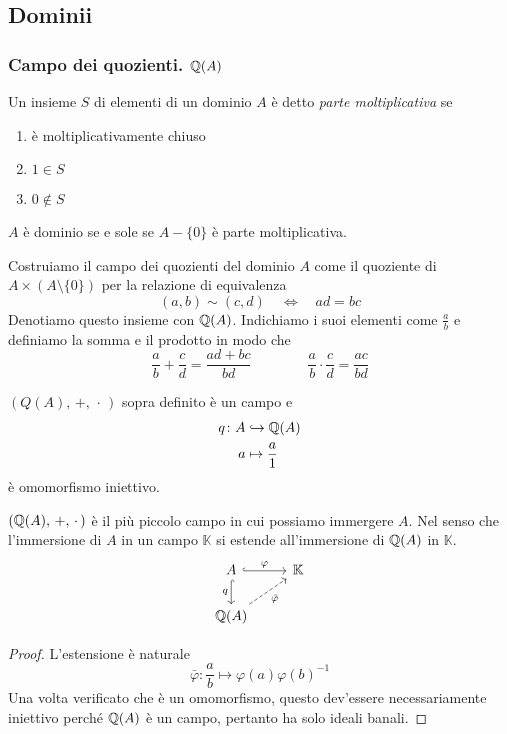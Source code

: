 \subsection{Dominii}
\begin{multicols}{2}

\subsubsection{Campo dei quozienti. $ \mathbb{Q}(A) $}

\begin{definition}
	Un insieme $ S $ di elementi di un dominio $ A $ è detto \emph{parte moltiplicativa} se
	\begin{enumerate}
		\item è moltiplicativamente chiuso
		\item $ 1 \in S $
		\item $ 0 \notin S $
	\end{enumerate}
\end{definition}

\begin{remark}
	$ A $ è dominio se e sole se $ A - \{0\} $ è parte moltiplicativa.
\end{remark}

Costruiamo il campo dei quozienti del dominio $ A $ come il quoziente di $ A \times (A \setminus \{0\}) $ per la relazione di equivalenza $$  (a, b) \sim (c, d) \quad\Leftrightarrow\quad ad = bc $$
Denotiamo questo insieme con $ \mathbb{Q}(A) $. Indichiamo i suoi elementi come $ \frac{a}{b} $ e definiamo la somma e il prodotto in modo che
\[ \frac{a}{b} + \frac{c}{d} = \frac{ad + bc}{bd} \qquad\qquad \frac{a}{b}\cdot \frac{c}{d} = \frac{ac}{bd} \]

\begin{remark}
	$ (Q(A),\, +,\, \cdot\,) $ sopra definito è un campo e
	\begin{align*}
	q \colon A &\hookrightarrow \mathbb{Q}(A) \\
	a &\mapsto \frac{a}{1}
	\end{align*}
	è omomorfismo iniettivo.
\end{remark}

\begin{theorem}
	$ (\mathbb{Q}(A),\, +,\, \cdot\,) $ è il più piccolo campo in cui possiamo immergere $ A $. Nel senso che l'immersione di $ A $ in un campo $ \mathbb{K} $ si estende all'immersione di $ \mathbb{Q}(A) $ in $ \mathbb{K} $.
	\[ \begin{tikzcd}
	A \arrow[hook]{r}{\varphi} \arrow[swap, hook]{d}{q} & \K \\
	\Q(A) \arrow[swap, dashed]{ru}{\bar{\varphi}}
	\end{tikzcd} \]
\end{theorem}
\begin{proof}
	L'estensione è naturale
	\[ \bar{\varphi}: \frac{a}{b} \mapsto \varphi(a) \varphi(b)^{-1} \]
	Una volta verificato che è un omomorfismo, questo dev'essere necessariamente iniettivo perché $ \mathbb{Q}(A) $ è un campo, pertanto ha solo ideali banali.
\end{proof}


\end{multicols}
